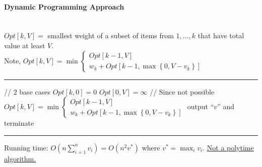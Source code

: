 \documentclass[12 pt]{article}
\begin{document}
          \paragraph{Dynamic Programming Approach}~
          \\ $Opt[k,V]=$ smallest weight of a subset of items from
          $1,\ldots,k$ that have total value at least $V$.
          \\ Note, $Opt[k,V]=\min
          \begin{cases}
            Opt[k-1,V]
            \\ w_k+Opt[k-1,\max \left\{0, V-v_k\right\}]
          \end{cases}
          $
          \\ \noindent \rule{\textwidth}{0.5pt}
          \begin{algorithmic}
            \State // $2$ base cases
                \State $Opt[k,0]=0$
            \EndFor
                \State $Opt[0,V]=\infty$ // Since not possible
            \EndFor
                    \State $Opt[k,V]=\min
          \begin{cases}
            Opt[k-1,V]
            \\ w_k+Opt[k-1,\max \left\{0, V-v_k\right\}]
          \end{cases}
          $
                \EndFor
            \EndFor
                    \State output ``$v$'' and terminate
                \EndIf
            \EndFor
          \end{algorithmic}
          \noindent \rule{\textwidth}{0.5pt}
          Running time: $O(n \sum_{i=1}^n v_i)=O(n^2 v^*)$ where $v^*
          = \max_i v_i$. \underline{Not a polytime algorithm.}
\end{document}
